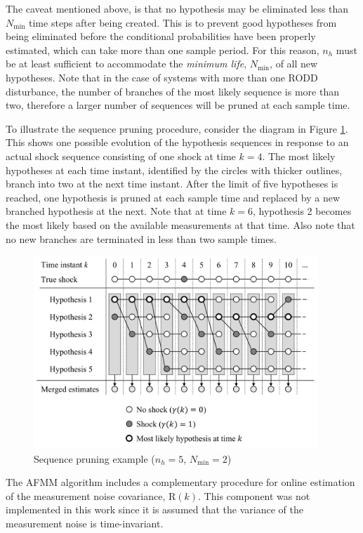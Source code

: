 The caveat mentioned above, is that no hypothesis may be eliminated less than $N_\text{min}$ time steps after being created. This is to prevent good hypotheses from being eliminated before the conditional probabilities have been properly estimated, which can take more than one sample period. For this reason, $n_h$ must be at least sufficient to accommodate the \textit{minimum life}, $N_\text{min}$, of all new hypotheses. Note that in the case of systems with more than one \gls{RODD} disturbance, the number of branches of the most likely sequence is more than two, therefore a larger number of sequences will be pruned at each sample time.
%

To illustrate the sequence pruning procedure, consider the diagram in Figure \ref{fig:mm-obs-seq-SP}. This shows one possible evolution of the hypothesis sequences in response to an actual shock sequence consisting of one shock at time $k=4$.  The most likely hypotheses at each time instant, identified by the circles with thicker outlines, branch into two at the next time instant. After the limit of five hypotheses is reached, one hypothesis is pruned at each sample time and replaced by a new branched hypothesis at the next. Note that at time $k=6$, hypothesis 2 becomes the most likely based on the available measurements at that time. Also note that no new branches are terminated in less than two sample times.
\begin{figure}[ht]
	\centering
	\includegraphics[width=10.7cm]{images/mm_obs_seq_SP.pdf}
	\caption{Sequence pruning example ($n_h=5$, $N_\text{min}=2$)}
	\label{fig:mm-obs-seq-SP}
\end{figure}

The \gls{AFMM} algorithm includes a complementary procedure for online estimation of the measurement noise covariance, $\mathrm{R}(k)$. This component was not implemented in this work since it is assumed that the variance of the measurement noise is time-invariant.


